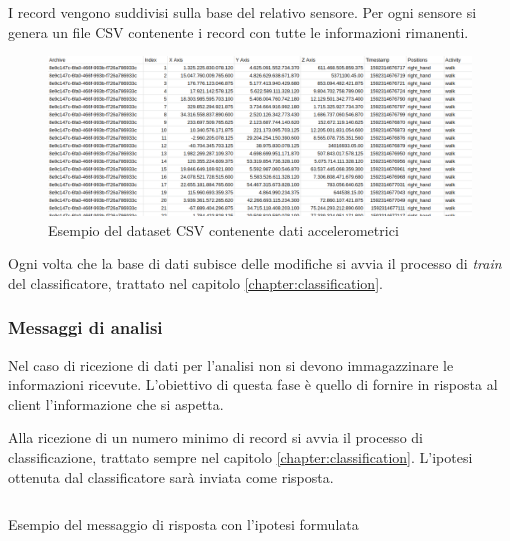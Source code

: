 \vspace{5mm} %
I record vengono suddivisi sulla base del relativo sensore. Per ogni sensore si genera un file CSV contenente i record con tutte 
le informazioni rimanenti.

\begin{figure}[H]
    \centering
    \includegraphics[scale = 0.39]{assets/images/examples/dataset-data-example.png}
    \caption{Esempio del dataset CSV contenente dati accelerometrici}
    \label{fig:example-dataset-csv-accelerometer}
\end{figure}

Ogni volta che la base di dati subisce delle modifiche si avvia il processo di \textit{train} del classificatore, 
trattato nel capitolo \ref{chapter:classification}.


\subsubsection{Messaggi di analisi}
Nel caso di ricezione di dati per l'analisi non si devono immagazzinare le informazioni ricevute. 
L'obiettivo di questa fase è quello di fornire in risposta al client l'informazione che si aspetta.

Alla ricezione di un numero minimo di record si avvia il processo di classificazione, trattato sempre nel capitolo \ref{chapter:classification}.
L'ipotesi ottenuta dal classificatore sarà inviata come risposta.
\vfill
\begin{listing}[H] 
    \inputminted[frame=single,framesep=10pt]{json}{assets/snippets/server/receiver/prediction.json}
    \caption{Esempio del messaggio di risposta con l'ipotesi formulata}
    \label{listing:example-message-prediction}
\end{listing}